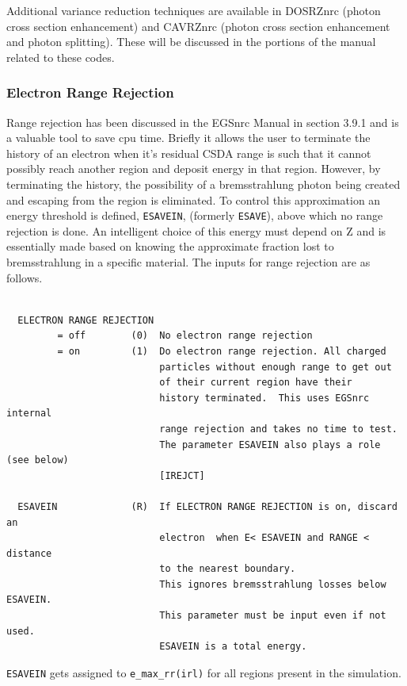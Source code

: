 \documentclass[12pt,twoside]{article}  %
\begin{document}
Additional variance reduction techniques are
available in DOSRZnrc (photon cross section enhancement) and
CAVRZnrc (photon cross section enhancement and photon splitting).
These will be discussed in the portions of the manual related to
these codes.

\subsubsection{Electron Range Rejection}

Range rejection has been discussed in the EGSnrc Manual
\cite{KR00} in section 3.9.1
and is a valuable tool to save cpu time.
Briefly it allows the user to terminate the history of an electron when
it's residual CSDA range is such that it cannot possibly reach another
region and deposit energy in that region. However, by terminating the
history, the possibility of a bremsstrahlung photon being created and
escaping from the region is eliminated. To control this approximation
an energy threshold is defined, \verb+ESAVEIN+, (formerly
\verb+ESAVE+), above which no range rejection is done. An intelligent
choice of this energy must depend on Z and is essentially
made based on knowing the approximate fraction lost to bremsstrahlung in a
specific material. The inputs for range rejection are as follows.

\begin{verbatim}

  ELECTRON RANGE REJECTION
         = off        (0)  No electron range rejection
         = on         (1)  Do electron range rejection. All charged
                           particles without enough range to get out
                           of their current region have their
                           history terminated.  This uses EGSnrc internal
                           range rejection and takes no time to test.
                           The parameter ESAVEIN also plays a role (see below)
                           [IREJCT]

  ESAVEIN             (R)  If ELECTRON RANGE REJECTION is on, discard an
                           electron  when E< ESAVEIN and RANGE < distance
                           to the nearest boundary.
                           This ignores bremsstrahlung losses below ESAVEIN.
                           This parameter must be input even if not used.
                           ESAVEIN is a total energy.
\end{verbatim}
\noindent \verb+ESAVEIN+ gets assigned to \verb+e_max_rr(irl)+ for all
regions present in the simulation.
\end{document}
